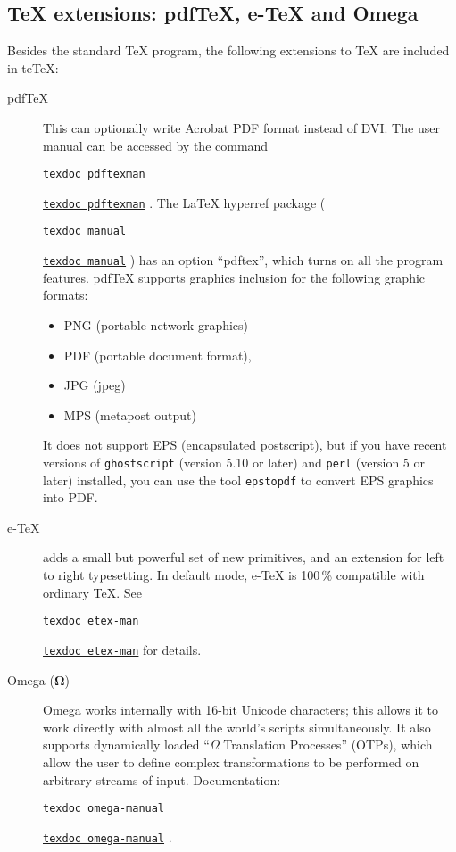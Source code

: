 \documentclass[11pt,a4paper]{article}
\newif\ifpdfoutput
\newcommand{\pdfext}{pdf}
\newcommand{\dviext}{dvi}
\let\docext=\pdfext
\let\docext=\dviext
\newcommand{\dlink}[3]{%
  \ifpdfoutput
    \ifx\pdfext#3
      \href{#1/#2.#3}{\texttt{texdoc #2}}%
    \else
      \texttt{texdoc #2}%
    \fi
  \else
     \href{#1/#2.#3}{\mbox{\texttt{texdoc #2}}}%
  \fi}
\begin{document}
\subsection{\TeX{} extensions: pdf\TeX, e-\TeX{} and Omega}
Besides the standard \TeX{} program, the
  following extensions to \TeX{} are included in te\TeX:
\begin{description}
\item [pdf\TeX] This can optionally write Acrobat PDF format instead
  of DVI. The user manual can be accessed by the command
  \dlink{../pdftex/base}{pdftexman}{\pdfext}. The \LaTeX{} hyperref
  package (\dlink{../latex/hyperref}{manual}{\pdfext}) has an option
  ``pdftex'', which turns on all the program features. pdf\TeX{}
  supports graphics inclusion for the following graphic formats:
  \begin{itemize}
  \item PNG (portable network graphics)
  \item PDF (portable document format),
  \item JPG (jpeg)
  \item MPS (metapost output)
  \end{itemize}
  It does not support EPS (encapsulated
  postscript), but if you have recent versions of
  \texttt{ghostscript} (version 5.10 or later) and \texttt{perl}
  (version 5 or later) installed, you can use the tool
  \texttt{epstopdf} to convert EPS graphics into PDF.
\item [e-\TeX] adds a small but powerful set of new primitives, and an
  extension for left to right typesetting. In default mode, e-\TeX{}
  is 100\,\% compatible with ordinary \TeX.  See
  \dlink{../etex/base}{etex-man}{\docext} for details.
\item [Omega ($\bm \Omega$)] Omega works internally with 16-bit
  Unicode characters; this allows it to work directly with
  almost all the world's scripts simultaneously. It also supports
  dynamically loaded ``$\Omega$ Translation Processes'' (OTPs), which
  allow the user to define complex transformations to be performed on
  arbitrary streams of input. Documentation:
  \dlink{../omega/base}{omega-manual}{\docext}.
\end{description}
\end{document}

